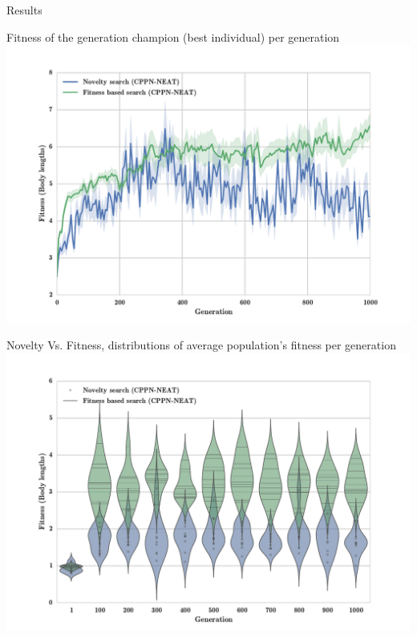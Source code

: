 \documentclass{beamer}
\begin{document}
\begin{frame}[allowframebreaks]{Results}
\begin{minipage}{\textwidth}
\begin{block}{Fitness of the generation champion (best individual) per generation}
\includegraphics[width=1.0\textwidth]{figures/results/AvgGenerChampNoveltyFitnessSize5.pdf}
\end{block}
\end{minipage}

\begin{minipage}{\textwidth}
\begin{block}{Novelty Vs. Fitness, distributions of average population's fitness per generation}
\includegraphics[width=1.0\textwidth]{figures/results/ViolinPlotsAvgGenFitSize5.pdf}
\end{block}
\end{minipage}


\end{frame}
\end{document}
